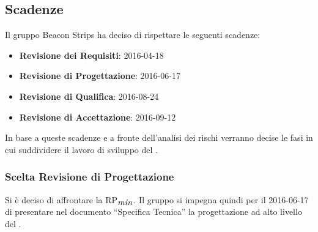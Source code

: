	\subsection{Scadenze}
	Il gruppo Beacon Strips ha deciso di rispettare le seguenti scadenze:
	\begin{itemize} 
		\item \textbf{Revisione dei Requisiti}: 2016-04-18
		\item \textbf{Revisione di Progettazione}: 2016-06-17
		\item \textbf{Revisione di Qualifica}: 2016-08-24
		\item \textbf{Revisione di Accettazione}: 2016-09-12
	\end{itemize}
	In base a queste scadenze e a fronte dell'analisi dei rischi verranno decise le fasi in cui suddividere il lavoro di sviluppo del .
	\subsubsection{Scelta Revisione di Progettazione}
	Si è deciso di affrontare la RP$_{\mbox{\textit{min}}}$. Il gruppo si impegna quindi per il 2016-06-17 di presentare nel documento ``Specifica Tecnica'' la progettazione ad alto livello del .
	